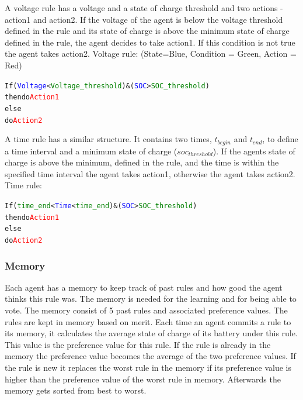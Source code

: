\documentclass[a4paper]{article}
\begin{document}
A voltage rule has a voltage and a state of charge threshold and two actions - action1 and action2. 
If the voltage of the agent is below  the voltage threshold defined in the rule and its state of charge is above 
the minimum state of charge defined in the rule, the agent decides to take action1. If this condition is not true the 
agent takes action2. 
Voltage rule: (State=Blue, Condition = Green, Action = Red) \\ 
\begin{alltt}
If (\textcolor{blue}{Voltage} < \textcolor{green}{Voltage_threshold}) & (\textcolor{blue}{SOC} > \textcolor{green}{SOC_threshold})
    then do \textcolor{red}{Action1} 
else 
    do \textcolor{red}{Action2} 
\end{alltt}

A time rule has a similar structure. It contains two times, $t_{begin}$ and $t_{end}$, to define a time interval and 
a minimum state of charge ($soc_{threshold}$). If the agents state of charge is above the minimum, defined in the rule, 
and the time is within the specified time interval the agent takes action1, otherwise the agent takes action2. 
Time rule: \\ 
\begin{alltt}
If (\textcolor{green}{time_end} < \textcolor{blue}{Time} < \textcolor{green}{time_end}) & (\textcolor{blue}{SOC} > \textcolor{green}{SOC_threshold}) 
    then do \textcolor{red}{Action1} 
else 
    do \textcolor{red}{Action2} 
\end{alltt}

\subsubsection{Memory}
Each agent has a memory to keep track of past rules and how good the agent thinks this rule was. The memory 
is needed for the learning and for being able to vote. The memory consist of 5 past rules and associated preference 
values. The rules are kept in memory based on merit.
Each time an agent commits a rule to its memory, it calculates the average state of charge of its battery under this rule. 
This value is the preference value for this rule. If the rule is already in the memory the preference value becomes the 
average of the two preference values. If the rule is new it replaces the worst rule in the memory if its preference value 
is higher than the preference value of the worst rule in memory. Afterwards the memory gets sorted from best to worst. 
\end{document}
